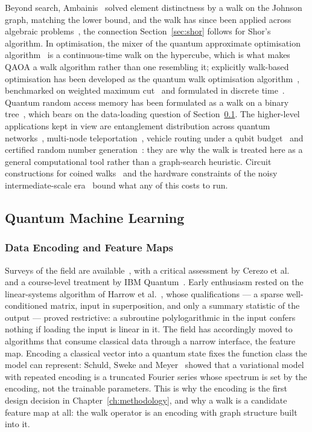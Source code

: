 Beyond search, Ambainis~\cite{Ambainis_2003} solved element distinctness by a
walk on the Johnson graph, matching the lower bound, and the walk has since
been applied across algebraic problems~\cite{Childs_2008}, the connection
Section~\ref{sec:shor} follows for Shor's algorithm. In optimisation, the
mixer of the quantum approximate optimisation algorithm~\cite{Farhi_2014,
Farhi_2016} is a continuous-time walk on the hypercube, which is what makes
QAOA a walk algorithm rather than one resembling it; explicitly walk-based
optimisation has been developed as the quantum walk optimisation
algorithm~\cite{Marsh_2020}, benchmarked on weighted maximum
cut~\cite{Bennett_2025} and formulated in discrete
time~\cite{Liliopoulos_2024}. Quantum random access memory has been
formulated as a walk on a binary tree~\cite{Asaka_2021, Asaka_2023}, which
bears on the data-loading question of Section~\ref{sec:lr-qml}. The
higher-level applications kept in view are entanglement distribution across
quantum networks~\cite{Chen_2024c}, multi-node teleportation~\cite{Ikken_2025},
vehicle routing under a qubit budget~\cite{Gautam_2024} and certified random
number generation~\cite{Haider_2023}: they are why the walk is treated here as
a general computational tool rather than a graph-search heuristic. Circuit
constructions for coined walks~\cite{Douglas_2007, Han_2017, Shakeel_2020,
Sato_2024} and the hardware constraints of the noisy intermediate-scale
era~\cite{Preskill_2018} bound what any of this costs to run.

\subsection{Quantum Machine Learning}
\label{sec:lr-qml}

\subsubsection{Data Encoding and Feature Maps}
Surveys of the field are available~\cite{Schuld_2015, Biamonte_2017,
Ciliberto_2018, Zeguendry_2023}, with a critical assessment by Cerezo et
al.~\cite{Cerezo_2023} and a course-level treatment by IBM
Quantum~\cite{IBMQML2026}. Early enthusiasm rested on the linear-systems
algorithm of Harrow et al.~\cite{Harrow_2008}, whose qualifications --- a
sparse well-conditioned matrix, input in superposition, and only a summary
statistic of the output --- proved restrictive: a subroutine polylogarithmic
in the input confers nothing if loading the input is linear in it. The field
has accordingly moved to algorithms that consume classical data through a
narrow interface, the feature map. Encoding a classical vector into a quantum
state fixes the function class the model can represent: Schuld, Sweke and
Meyer~\cite{Schuld_2021a} showed that a variational model with repeated
encoding is a truncated Fourier series whose spectrum is set by the encoding,
not the trainable parameters. This is why the encoding is the first design
decision in Chapter~\ref{ch:methodology}, and why a walk is a candidate
feature map at all: the walk operator is an encoding with graph structure
built into it.

